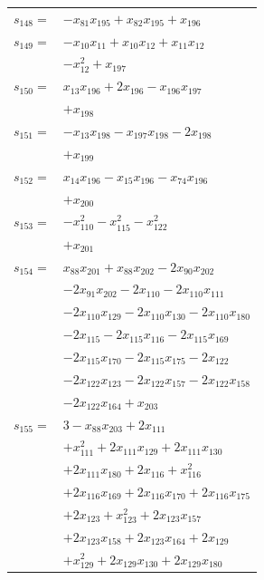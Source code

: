 \begin{longtable}{@{}r@{\;}l@{}}
\(s_{148}=\) & \(\displaystyle -x_{81}x_{195} +x_{82}x_{195} +x_{196}\) \\[3pt]
\(s_{149}=\) & \(\displaystyle -x_{10}x_{11} +x_{10}x_{12} +x_{11}x_{12}\) \\
 & \(\displaystyle -x_{12}^{2} +x_{197}\) \\[3pt]
\(s_{150}=\) & \(\displaystyle x_{13}x_{196} +2x_{196} -x_{196}x_{197}\) \\
 & \(\displaystyle +x_{198}\) \\[3pt]
\(s_{151}=\) & \(\displaystyle -x_{13}x_{198} -x_{197}x_{198} -2x_{198}\) \\
 & \(\displaystyle +x_{199}\) \\[3pt]
\(s_{152}=\) & \(\displaystyle x_{14}x_{196} -x_{15}x_{196} -x_{74}x_{196}\) \\
 & \(\displaystyle +x_{200}\) \\[3pt]
\(s_{153}=\) & \(\displaystyle -x_{110}^{2} -x_{115}^{2} -x_{122}^{2}\) \\
 & \(\displaystyle +x_{201}\) \\[3pt]
\(s_{154}=\) & \(\displaystyle x_{88}x_{201} +x_{88}x_{202} -2x_{90}x_{202}\) \\
 & \(\displaystyle -2x_{91}x_{202} -2x_{110} -2x_{110}x_{111}\) \\
 & \(\displaystyle -2x_{110}x_{129} -2x_{110}x_{130} -2x_{110}x_{180}\) \\
 & \(\displaystyle -2x_{115} -2x_{115}x_{116} -2x_{115}x_{169}\) \\
 & \(\displaystyle -2x_{115}x_{170} -2x_{115}x_{175} -2x_{122}\) \\
 & \(\displaystyle -2x_{122}x_{123} -2x_{122}x_{157} -2x_{122}x_{158}\) \\
 & \(\displaystyle -2x_{122}x_{164} +x_{203}\) \\[3pt]
\(s_{155}=\) & \(\displaystyle 3 -x_{88}x_{203} +2x_{111}\) \\
 & \(\displaystyle +x_{111}^{2} +2x_{111}x_{129} +2x_{111}x_{130}\) \\
 & \(\displaystyle +2x_{111}x_{180} +2x_{116} +x_{116}^{2}\) \\
 & \(\displaystyle +2x_{116}x_{169} +2x_{116}x_{170} +2x_{116}x_{175}\) \\
 & \(\displaystyle +2x_{123} +x_{123}^{2} +2x_{123}x_{157}\) \\
 & \(\displaystyle +2x_{123}x_{158} +2x_{123}x_{164} +2x_{129}\) \\
 & \(\displaystyle +x_{129}^{2} +2x_{129}x_{130} +2x_{129}x_{180}\) \\

\end{longtable}
